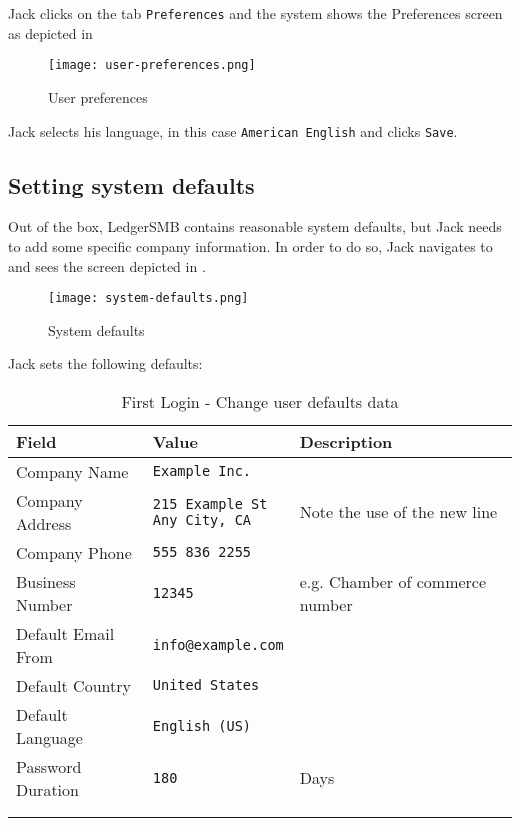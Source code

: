 Jack clicks on the tab \texttt{Preferences} and the system shows the Preferences screen 
as depicted in 

\begin{figure}[H]
	\centering
	\texttt{[image: user-preferences.png]}
	\caption{User preferences}
	\label{fig:first-user-preferences}
\end{figure}

Jack selects his language, in this case \texttt{American English} and clicks \texttt{Save}.

\subsection{Setting system defaults}
\label{subsec-setting-system-defaults}

Out of the box, LedgerSMB contains reasonable system defaults, but Jack needs to add some specific company information.
In order to do so, Jack navigates to  and sees the screen depicted in .
 
\begin{figure}[H]
	\centering
	\texttt{[image: system-defaults.png]}
	\caption{System defaults}
	\label{fig:first-user-system-defaults}
\end{figure}

Jack sets the following defaults:
\begin{longtable}{ llp{6cm} }
	Field & Value & Description \\ \hline
	\endhead
	Company Name & \texttt{Example Inc.} & \\
	Company Address &  \makecell[l]{\texttt{215 Example St} \\  \texttt{Any City, CA}} & Note the use of the new line\\
	Company Phone &  \texttt{555 836 2255} & \\
	Business Number &  \texttt{12345} & e.g. Chamber of commerce number\\
	Default Email From & \texttt{info@example.com} & \\
	Default Country & \texttt{United States}  & \\
	Default Language &  \texttt{English (US)} & \\
	Password Duration &  \texttt{180} & Days\\
	\\
\caption{First Login - Change user defaults data}
\label{fig:first-user-user-default-data}
\end{longtable}

